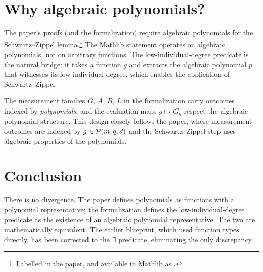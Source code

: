 \documentclass{article}
\begin{document}
\section{Why algebraic polynomials?}

The paper's proofs (and the formalization) require algebraic
polynomials for the Schwartz--Zippel lemma.\footnote{Labelled
 in the paper, and available
in Mathlib as .}
The Mathlib statement operates on algebraic polynomials, not on
arbitrary functions. The low-individual-degree predicate is the
natural bridge: it takes a function $g$ and extracts the algebraic
polynomial $p$ that witnesses its low individual degree, which
enables the application of Schwartz--Zippel.

The measurement families $G$, $A$, $B$, $L$ in the formalization
carry outcomes indexed by \emph{polynomials}, and the evaluation
maps $g \mapsto G_{g}$ respect the algebraic polynomial structure.
This design closely follows the paper, where measurement outcomes
are indexed by $g \in \mathcal{P}(m, q, d)$ and the Schwartz--Zippel
step uses algebraic properties of the polynomials.

\section{Conclusion}

There is no divergence. The paper defines polynomials as functions
with a polynomial representative; the formalization defines the
low-individual-degree predicate as the existence of an algebraic
polynomial representative. The two are mathematically equivalent.
The earlier blueprint, which used function types directly, has been
corrected to the $\exists$ predicate, eliminating the only
discrepancy.



\end{document}
